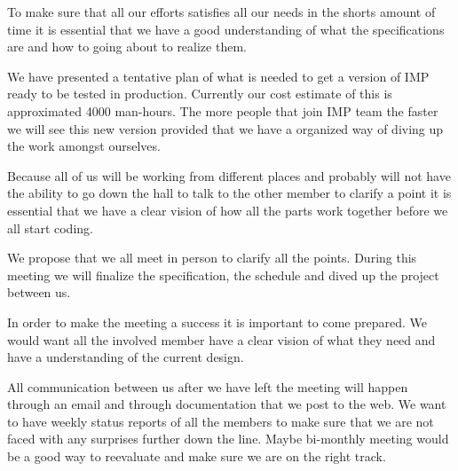 To make sure that all our efforts satisfies all our needs in the shorts amount of time it is essential that we have a good understanding of what the specifications are and how to going about to realize them. 

We have presented a tentative plan of what is needed to get a version of IMP ready to be tested in production. Currently our cost estimate of this is approximated 4000 man-hours. The more people that join IMP team the faster we will see this new version provided that we have a organized way of diving up the work amongst ourselves.

Because all of us will be working from different places and probably will not have the ability to go down the hall to talk to the other member to clarify a point it is essential that we have a clear vision of how all the parts work together before we all start coding.

We propose that we all meet in person to clarify all the points. During this meeting we will finalize the specification, the schedule and dived up the project between us.

In order to make the meeting a success it is important to come prepared. We would want all the involved member have a clear vision of what they need and have a understanding of the current design. 

All communication between us after we have left the meeting will happen through an email and through documentation that we post to the web. We want to have weekly status reports of all the members to make sure that we are not faced with any surprises further down the line. Maybe bi-monthly meeting would be a good way to reevaluate and make sure we are on the right track.



 




